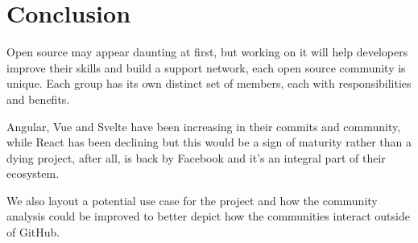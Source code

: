\section{Conclusion}
Open source may appear daunting at first, but working on it will help developers improve their skills and build a support network, each open source community is unique. Each group has its own distinct set of members, each with responsibilities and benefits.

Angular, Vue and Svelte have been increasing in their commits and community, while React has been declining but this would be a sign of maturity rather than a dying project, after all, is back by Facebook and it's an integral part of their ecosystem.

We also layout a potential use case for the project and how the community analysis could be improved to better depict how the communities interact outside of GitHub.